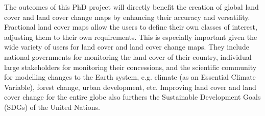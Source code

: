 \documentclass[10pt]{article}
\begin{document}

\begin{mdframed}[style=table,frametitle=\textbf{9. SOCIETAL RELEVANCE}]
The outcomes of this PhD project will directly benefit the creation of global land cover and land cover change maps by enhancing their accuracy and versatility. Fractional land cover maps allow the users to define their own classes of interest, adjusting them to their own requirements. This is especially important given the wide variety of users for land cover and land cover change maps. They include national governments for monitoring the land cover of their country, individual large stakeholders for monitoring their concessions, and the scientific community for modelling changes to the Earth system, e.g. climate (as an Essential Climate Variable), forest change, urban development, etc. Improving land cover and land cover change for the entire globe also furthers the Sustainable Development Goals (SDGs) of the United Nations.
\end{mdframed}
\end{document}
